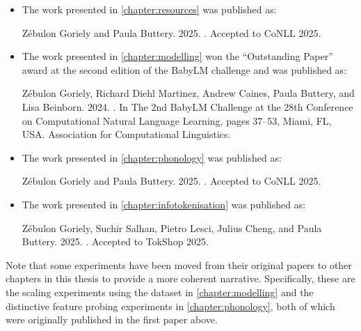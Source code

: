 \begin{itemize}
\item The work presented in \cref{chapter:resources} was published as:
\begin{mdframed}[linewidth=1pt]
Z\'ebulon Goriely and Paula Buttery. 2025. \href{https://arxiv.org/abs/2504.03036}{}. Accepted to CoNLL 2025.
\end{mdframed}

\item The work presented in \cref{chapter:modelling} won the \enquote{Outstanding Paper} award at the second edition of the BabyLM challenge and was published as:
\begin{mdframed}[linewidth=1pt]
Z\'ebulon Goriely, Richard Diehl Martinez, Andrew Caines, Paula Buttery, and Lisa Beinborn. 2024. \href{https://aclanthology.org/2024.conll-babylm.4/#}{}. In The 2nd BabyLM Challenge at the 28th Conference on Computational Natural Language Learning, pages 37--53, Miami, FL, USA. Association for Computational Linguistics.
\end{mdframed}

\item The work presented in \cref{chapter:phonology} was published as:
\begin{mdframed}[linewidth=1pt]
Z\'ebulon Goriely and Paula Buttery. 2025. \href{https://arxiv.org/abs/2504.03338}{}. Accepted to CoNLL 2025.
\end{mdframed}

\item The work presented in \cref{chapter:infotokenisation} was published as:
\begin{mdframed}[linewidth=1pt]
Z\'ebulon Goriely, Suchir Salhan, Pietro Lesci, Julius Cheng, and Paula Buttery. 2025. \href{https://arxiv.org/abs/2506.18639}{}. Accepted to TokShop 2025.
\end{mdframed}
\end{itemize}

Note that some experiments have been moved from their original papers to other chapters in this thesis to provide a more coherent narrative. Specifically, these are the scaling experiments using the \ipachildes dataset in \cref{chapter:modelling} and the distinctive feature probing experiments in \cref{chapter:phonology}, both of which were originally published in the first paper above.

